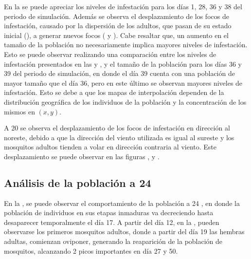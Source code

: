 En la  se puede apreciar los niveles de infestación para los
días 1, 28, 36 y 38 del periodo de simulación. Además se observa el desplazamiento de los focos de
infestación, causado por la dispersión de los adultos, que pasan de su estado inicial
(), a generar nuevos focos
( y ). Cabe resaltar
que, un aumento en el tamaño de la población no necesariamente implica mayores niveles de
infestación. Esto se puede observar realizando una comparación entre los niveles de infestación
presentados en las  y ,
y el tamaño de la población para los días 36 y 39 del periodo de simulación, en donde el día 39
cuenta con una población de mayor tamaño que el día 36, pero en este último se observan mayores
niveles de infestación. Esto se debe a que los mapas de interpolación dependen de la distribución
geográfica de los individuos de la población y la concentración de los mismos en $(x,y)$.

A 20 \textcelsius se observa el desplazamiento de los focos de infestación en dirección al
noreste, debido a que la dirección del viento utilizada es igual al sureste y los mosquitos
adultos tienden a volar en dirección contraria al viento. Este desplazamiento se puede observar en
las figuras ,  y
.

\subsection{Análisis de la población a 24\textcelsius}
En la , se puede observar el comportamiento de la población a
24 \textcelsius, en donde la población de individuos en sus etapas inmaduras va decreciendo hasta
desaparecer temporalmente el día 17. A partir del día 12, en la
, pueden observarse los primeros mosquitos adultos, donde a
partir del día 19 las hembras adultas, comienzan oviponer, generando la reaparición de la
población de mosquitos, alcanzando 2 picos importantes en día 27 y 50.

